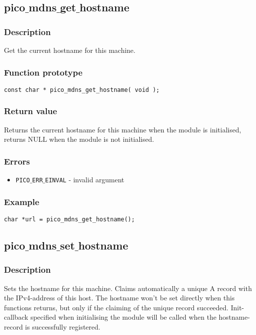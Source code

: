 \subsection{pico$\_$mdns$\_$get$\_$hostname}

\subsubsection*{Description}
Get the current hostname for this machine.

\subsubsection*{Function prototype}
\begin{verbatim}
const char * pico_mdns_get_hostname( void );
\end{verbatim}

\subsubsection*{Return value}
Returns the current hostname for this machine when the module is initialised, returns NULL when the module is not initialised.

\subsubsection*{Errors}
\begin{itemize}[noitemsep]
\item \texttt{PICO$\_$ERR$\_$EINVAL} - invalid argument
\end{itemize}

\subsubsection*{Example}
\begin{verbatim}
char *url = pico_mdns_get_hostname();
\end{verbatim}


\subsection{pico$\_$mdns$\_$set$\_$hostname}

\subsubsection*{Description}
Sets the hostname for this machine. Claims automatically a unique A record with the IPv4-address of this host. The hostname won't be set directly when this functions returns, but only if the claiming of the unique record succeeded. Init-callback specified when initialising the module will be called when the hostname-record is successfully registered.

